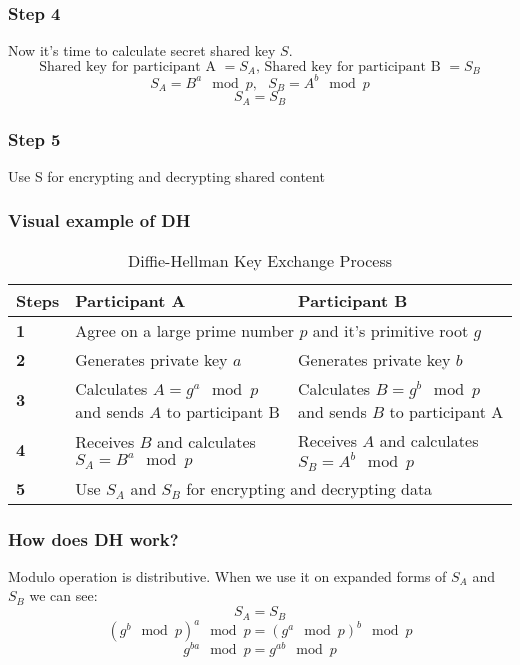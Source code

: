 \documentclass[bp,en]{FEIstyle}
\begin{document}
\subsubsection*{Step 4}
Now it's time to calculate secret shared key $S$. 
\[
\text{Shared key for participant A }= S_A\text{, Shared key for participant B }= S_B
\]
\[
S_A=B^a\mod p, \text{ }S_B=A^b\mod p 
\]
\[
S_A=S_B 
\]


\subsubsection*{Step 5}
Use S for encrypting and decrypting shared content 

\subsubsection*{Visual example of DH}
\begin{table}[h!]
\centering
\small %
\begin{tabular}{|p{1cm}|p{5cm}|p{5cm}|} %
\hline
\textbf{Steps} & \textbf{Participant A} & \textbf{Participant B} \\ \hline
\textbf{1} & \multicolumn{2}{p{10cm}|}{Agree on a large prime number \( p \) and it's primitive root \( g \) } \\ \hline
\textbf{2} & Generates private key \( a \) & Generates private key \( b \)  \\ \hline
\textbf{3} & Calculates \( A = g^a \mod p \) and sends \( A \) to participant B & Calculates \( B = g^b \mod p \) and sends \( B \) to participant A \\ \hline
\textbf{4} & Receives \( B \)  and calculates \( S_A = B^a \mod p \) & Receives \( A \)  and calculates \( S_B = A^b \mod p \) \\ \hline
\textbf{5} & \multicolumn{2}{p{10cm}|}{Use \(S_A\) and \(S_B\) for encrypting and decrypting data } \\ \hline
\end{tabular}
\caption{Diffie-Hellman Key Exchange Process}
\label{tab:diffie_hellman}
\end{table}


\subsubsection*{How does DH work?}
Modulo operation is distributive. When we use it on expanded forms of $S_A$ and $S_B$ we can see:
\[S_A=S_B
\]
\[
(g^b \mod p)^a \mod p = (g^a \mod p)^b \mod p
\]
\[
g^{ba} \mod p = g^{ab} \mod p
\]
\end{document}
